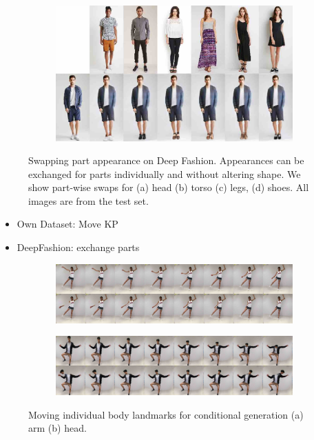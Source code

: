 \begin{figure}[ht]
\begin{subfigure}{0.49\linewidth}
		\label{fig:part3_21}
		\end{subfigure}
		\begin{subfigure}{0.49\linewidth}
		\centering
		\includegraphics[trim={0cm 0cm 0cm 0cm},clip, width=1.\linewidth]{fig/factor/part6_30}\caption{}
		\label{fig:part3_30}
		\end{subfigure}
		\caption{Swapping part appearance on Deep Fashion. Appearances can be exchanged for parts individually and without altering shape. We show part-wise swaps for (a) head (b) torso (c) legs, (d) shoes. All images are from the test set.}
		\label{fig:partswaps}
	\end{figure}
	\begin{itemize}
		\item Own Dataset: Move KP
		\item DeepFashion: exchange parts
	\end{itemize}
	\begin{figure}[htp]
		\centering
		\begin{subfigure}{1.\linewidth}
		\includegraphics[trim={0cm 0cm 0cm 0cm},clip, width=1.0\linewidth]{fig/factor/8arm}\caption{}
		\end{subfigure}

		\begin{subfigure}{1.\linewidth}
			\includegraphics[trim={0cm 0cm 0cm 0cm},clip, width=1.0\linewidth]{fig/factor/8head}\caption{}
		\end{subfigure}
		\caption{Moving individual body landmarks for conditional generation (a) arm (b) head.}
		\label{fig:movekp}
	\end{figure}
